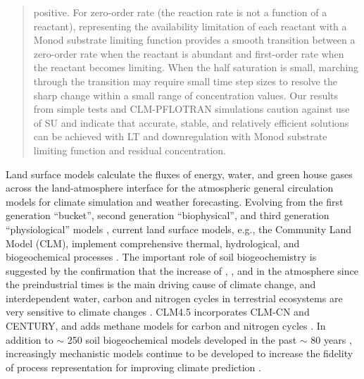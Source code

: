 \documentclass[gmd, manuscript]{copernicus}
\begin{document}
\begin{abstract}
positive. For zero-order rate (the reaction rate is not a function of a
reactant), representing the availability limitation of each reactant with a
Monod substrate limiting function provides a smooth transition between a
zero-order rate when the reactant is abundant and first-order rate when the
reactant becomes limiting. When the half saturation is small, marching through
the transition may require small time step sizes to resolve the sharp change
within a small range of concentration values. Our results from simple
tests and CLM-PFLOTRAN simulations caution against use of SU and indicate that
accurate, stable, and relatively efficient solutions can be achieved with LT
and downregulation with Monod substrate limiting function and residual
concentration.
\end{abstract}

\clearpage

%

\introduction  %
Land surface models calculate the fluxes of energy, water, and green house
gases across the land-atmosphere interface for the atmospheric general
circulation models for climate simulation and weather forecasting. Evolving
from the first generation ``bucket'', second generation ``biophysical'', and
third generation ``physiological'' models \citep{Sellers1997,Seneviratne2010},
current land surface models, e.g., the Community Land Model (CLM), implement
comprehensive thermal, hydrological, and biogeochemical processes
\citep{Oleson2013}. The important role of soil biogeochemistry is suggested by
the confirmation that the increase of , , and 
in the atmosphere since the preindustrial times is the main driving cause of
climate change, and interdependent water, carbon and nitrogen cycles in
terrestrial ecosystems are very sensitive to climate changes \citep{IPCC2013}.
CLM4.5 incorporates CLM-CN and CENTURY, and adds methane models for carbon and
nitrogen cycles \citep{Oleson2013}. In addition to $\sim$ 250 soil biogeochemical
models developed in the past $\sim$ 80 years \citep{Manzoni2009}, increasingly
mechanistic models continue to be developed to increase the fidelity of
process representation for improving climate prediction
\citep[e.g.,][]{Wang2012,Riley2014}. 
\end{document}
